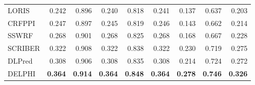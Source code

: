 \documentclass{bioinfo}
\begin{document}
\begin{table}[H]
\begin{tabular}{@{}l@{\ }*{8}{r}}
    LORIS & 0.242 & 0.896 & 0.240 & 0.818 & 0.241 & 0.137 & 0.637 & 0.203 \\
    CRFPPI & 0.247 & 0.897 & 0.245 & 0.819 & 0.246 & 0.143 & 0.662 & 0.214 \\
    SSWRF & 0.268 & 0.901 & 0.268 & 0.825 & 0.268 & 0.168 & 0.667 & 0.228 \\
    SCRIBER & 0.322 & 0.908 & 0.322 & 0.838 & 0.322 & 0.230 & 0.719 & 0.275 \\
    DLPred & 0.308 & 0.906 & 0.308 & 0.835 & 0.308 & 0.214 & 0.724 & 0.272 \\
    DELPHI & \textbf{0.364} & \textbf{0.914} & \textbf{0.364} & \textbf{0.848} & \textbf{0.364} & \textbf{0.278} & \textbf{0.746} & \textbf{0.326} \\
    \hline
    \end{tabular}%
  \label{tab_comp_448_355}%
\end{table}%
\end{document}
